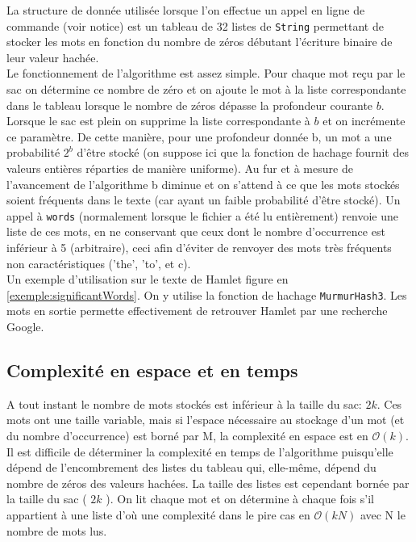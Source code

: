 \documentclass[12pt,a4paper,titlepage]{article}
\newcommand{\class}[1]{\texttt{#1}}
\begin{document}
La structure de donnée utilisée lorsque l'on effectue un appel en ligne de commande (voir notice) est un tableau de 32 listes de \class{String} permettant de stocker les mots en fonction du nombre de zéros débutant l'écriture binaire de leur valeur hachée.\\
Le fonctionnement de l'algorithme est assez simple. Pour chaque mot reçu par le sac on détermine ce nombre de zéro et on ajoute le mot à la liste correspondante dans le tableau lorsque le nombre de zéros dépasse la profondeur courante $b$. Lorsque le sac est plein on supprime la liste correspondante à $b$ et on incrémente ce paramètre. De cette manière, pour une profondeur donnée b, un mot a une probabilité $2^{b}$ d'être stocké (on suppose ici que la fonction de hachage fournit des valeurs entières réparties de manière uniforme). Au fur et à mesure de l'avancement de l'algorithme b diminue et on s'attend à ce que les mots stockés soient fréquents dans le texte (car ayant un faible probabilité d'être stocké). Un appel à \class{words} (normalement lorsque le fichier a été lu entièrement) renvoie une liste de ces mots, en ne conservant que ceux dont le nombre d'occurrence est inférieur à 5 (arbitraire), ceci afin d'éviter de renvoyer des mots très fréquents non caractéristiques ('the', 'to', et c).\\

Un exemple d'utilisation sur le texte de Hamlet figure en \ref{exemple:significantWords}. On y utilise la fonction de hachage \class{MurmurHash3}. Les mots en sortie permette effectivement de retrouver Hamlet par une recherche Google.

\subsection{Complexité en espace et en temps}

A tout instant le nombre de mots stockés est inférieur à la taille du sac: $2k$. Ces mots ont une taille variable, mais si l'espace nécessaire au stockage d'un mot (et du nombre d'occurrence) est borné par M, la complexité en espace est en $\mathcal{O}(k)$.\\

Il est difficile de déterminer la complexité en temps de l'algorithme puisqu'elle dépend de l'encombrement des listes du tableau qui, elle-même, dépend du nombre de zéros des valeurs hachées. La taille des listes est cependant bornée par la taille du sac ( $2k$ ). On lit chaque mot et on détermine à chaque fois s'il appartient à une liste d'où une complexité dans le pire cas en $\mathcal{O}(kN)$ avec N le nombre de mots lus.\\
\end{document}
